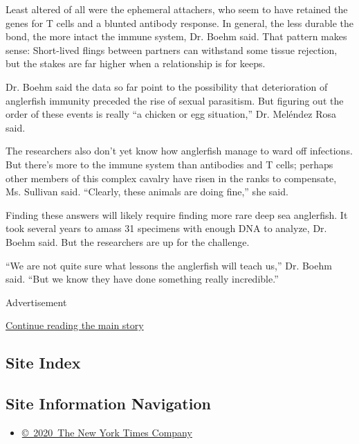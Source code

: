 Least altered of all were the ephemeral attachers, who seem to have
retained the genes for T cells and a blunted antibody response. In
general, the less durable the bond, the more intact the immune system,
Dr. Boehm said. That pattern makes sense: Short-lived flings between
partners can withstand some tissue rejection, but the stakes are far
higher when a relationship is for keeps.

Dr. Boehm said the data so far point to the possibility that
deterioration of anglerfish immunity preceded the rise of sexual
parasitism. But figuring out the order of these events is really ``a
chicken or egg situation,'' Dr. Meléndez Rosa said.

The researchers also don't yet know how anglerfish manage to ward off
infections. But there's more to the immune system than antibodies and T
cells; perhaps other members of this complex cavalry have risen in the
ranks to compensate, Ms. Sullivan said. ``Clearly, these animals are
doing fine,'' she said.

Finding these answers will likely require finding more rare deep sea
anglerfish. It took several years to amass 31 specimens with enough DNA
to analyze, Dr. Boehm said. But the researchers are up for the
challenge.

``We are not quite sure what lessons the anglerfish will teach us,'' Dr.
Boehm said. ``But we know they have done something really incredible.''

Advertisement

\protect\hyperlink{after-bottom}{Continue reading the main story}

\hypertarget{site-index}{%
\subsection{Site Index}\label{site-index}}

\hypertarget{site-information-navigation}{%
\subsection{Site Information
Navigation}\label{site-information-navigation}}

\begin{itemize}
\tightlist
\item
  \href{https://help.nytimes.com/hc/en-us/articles/115014792127-Copyright-notice}{©~2020~The
  New York Times Company}
\end{itemize}

